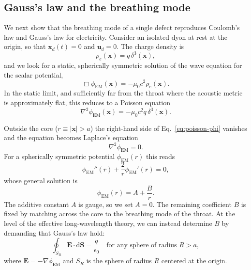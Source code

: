 \documentclass[11pt]{article}
\newcommand{\dd}{\mathrm{d}}
\begin{document}
\subsection{Gauss's law and the breathing mode}
\label{subsec:gauss-breathing}

We next show that the breathing mode of a single defect reproduces Coulomb's law and Gauss's law for electricity.  Consider an isolated dyon at rest at the origin, so that $\mathbf{x}_d(t) = 0$ and $\mathbf{u}_d = 0$.  The charge density is
\begin{equation}
\rho_e(\mathbf{x}) = q\,\delta^3(\mathbf{x}),
\end{equation}
and we look for a static, spherically symmetric solution of the wave equation for the scalar potential,
\begin{equation}
\Box \phi_{\mathrm{EM}}(\mathbf{x}) = -\mu_0 c^2 \rho_e(\mathbf{x}).
\end{equation}
In the static limit, and sufficiently far from the throat where the acoustic metric is approximately flat, this reduces to a Poisson equation
\begin{equation}
\nabla^2 \phi_{\mathrm{EM}}(\mathbf{x})
= -\mu_0 c^2 q\,\delta^3(\mathbf{x}).
\label{eq:poisson-phi}
\end{equation}

Outside the core ($r \equiv |\mathbf{x}| > a$) the right-hand side of Eq.~\eqref{eq:poisson-phi} vanishes and the equation becomes Laplace's equation
\begin{equation}
\nabla^2 \phi_{\mathrm{EM}} = 0.
\end{equation}
For a spherically symmetric potential $\phi_{\mathrm{EM}}(r)$ this reads
\begin{equation}
\phi_{\mathrm{EM}}''(r) + \frac{2}{r}\phi_{\mathrm{EM}}'(r) = 0,
\end{equation}
whose general solution is
\begin{equation}
\phi_{\mathrm{EM}}(r) = A + \frac{B}{r}.
\end{equation}
The additive constant $A$ is gauge, so we set $A=0$.  The remaining coefficient $B$ is fixed by matching across the core to the breathing mode of the throat.  At the level of the effective long-wavelength theory, we can instead determine $B$ by demanding that Gauss's law hold:
\begin{equation}
\oint_{S_R} \mathbf{E}\cdot\dd\mathbf{S}
= \frac{q}{\epsilon_0}
\quad\text{for any sphere of radius }R>a,
\label{eq:gauss-flux}
\end{equation}
where $\mathbf{E} = -\nabla \phi_{\mathrm{EM}}$ and $S_R$ is the sphere of radius $R$ centered at the origin.
\end{document}
